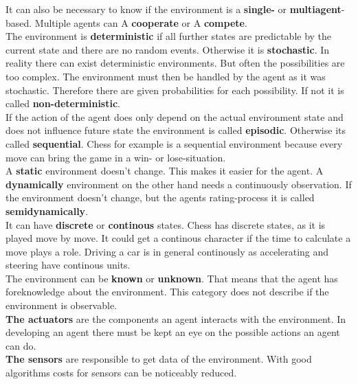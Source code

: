 \documentclass[10pt,a4paper,DIV=11]{scrreprt}
\begin{document}
It can also be necessary to know if the environment is a \textbf{single-} or \textbf{multiagent}-based. Multiple agents can A \textbf{cooperate} or A \textbf{compete}. \\

The environment is \textbf{deterministic} if all further states are predictable by the current state and there are no random events. Otherwise it is \textbf{stochastic}. In reality there can exist deterministic environments. But often the possibilities are too complex. The environment must then be handled by the agent as it was stochastic. Therefore there are given probabilities for each possibility. If not it is called \textbf{non-deterministic}. \\

If the action of the agent does only depend on the actual environment state and does not influence future state the environment is called \textbf{episodic}. Otherwise its called
\textbf{sequential}. Chess for example is a sequential environment because every move can bring the game in a win- or lose-situation. \\

A \textbf{static} environment doesn't change. This makes it easier for the agent. A \textbf{dynamically} environment on the other hand needs a continuously observation. If the environment doesn't change, but the agents rating-process it is called \textbf{semidynamically}. \\

It can have \textbf{discrete} or \textbf{continous} states. Chess has discrete states, as it is played move by move. It could get a continous character if the time to calculate a move plays a role. Driving a car is in general continously as accelerating and steering have continous units.\\

The environment can be \textbf{known} or \textbf{unknown}. That means that the agent has foreknowledge about the environment. This category does not describe if the environment is observable. \\


\textbf{The actuators} are the components an agent interacts with the environment. In developing an agent there must be kept an eye on the possible actions an agent can do.\\

\textbf{The sensors} are responsible to get data of the environment. With good algorithms costs for sensors can be noticeably reduced.
\end{document}
